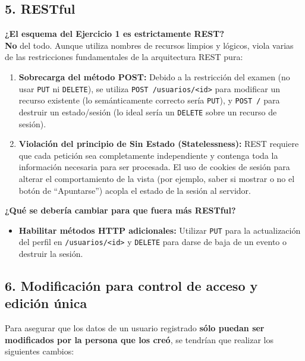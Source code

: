 \subsection*{5. RESTful}
\textbf{¿El esquema del Ejercicio 1 es estrictamente REST?} \\
\textbf{No} del todo. Aunque utiliza nombres de recursos limpios y lógicos, viola varias de las restricciones fundamentales de la arquitectura REST pura:

\begin{enumerate}
    \item \textbf{Sobrecarga del método POST:} Debido a la restricción del examen (no usar \texttt{PUT} ni \texttt{DELETE}), se utiliza \texttt{POST /usuarios/<id>} para modificar un recurso existente (lo semánticamente correcto sería \texttt{PUT}), y \texttt{POST /} para destruir un estado/sesión (lo ideal sería un \texttt{DELETE} sobre un recurso de sesión).
    \item \textbf{Violación del principio de Sin Estado (Statelessness):} REST requiere que cada petición sea completamente independiente y contenga toda la información necesaria para ser procesada. El uso de cookies de sesión para alterar el comportamiento de la vista (por ejemplo, saber si mostrar o no el botón de ``Apuntarse'') acopla el estado de la sesión al servidor.
\end{enumerate}

\noindent
\textbf{¿Qué se debería cambiar para que fuera más RESTful?}
\begin{itemize}
    \item \textbf{Habilitar métodos HTTP adicionales:} Utilizar \texttt{PUT} para la actualización del perfil en \texttt{/usuarios/<id>} y \texttt{DELETE} para darse de baja de un evento o destruir la sesión.
\end{itemize}

\subsection*{6. Modificación para control de acceso y edición única}

Para asegurar que los datos de un usuario registrado \textbf{sólo puedan ser modificados por la persona que los creó}, se tendrían que realizar los siguientes cambios:

